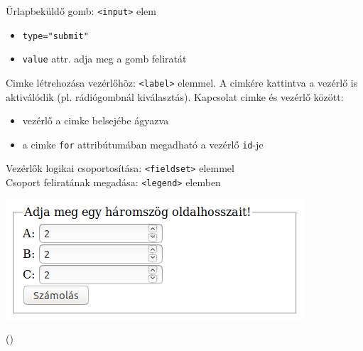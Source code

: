 \begin{frame}
  Űrlapbeküldő gomb: \texttt{<input>} elem
  \begin{itemize}
    \item \texttt{type="submit"}
    \item \texttt{value} attr. adja meg a gomb feliratát
  \end{itemize}
  \vfill
  Cimke létrehozása vezérlőhöz: \texttt{<label>} elemmel. A 
  cimkére kattintva a vezérlő is aktiválódik (pl. rádiógombnál 
  kiválasztás). Kapcsolat cimke és 
  vezérlő között:
  \begin{itemize}
    \item vezérlő a cimke belsejébe ágyazva
    \item a cimke \texttt{for} attribútumában megadható a vezérlő 
    \texttt{id}-je
  \end{itemize}
\end{frame}

\begin{frame}
  Vezérlők logikai csoportosítása: \texttt{<fieldset>} elemmel\\
  Csoport feliratának megadása: \texttt{<legend>} elemben
  \vfill
  \begin{center}
    \includegraphics[width=.5\textwidth]{urlap1.png}
  \end{center}
\end{frame}

\begin{frame}
  \begin{exampleblock}{ 
  ()}
    \footnotesize
    
  \end{exampleblock}
\end{frame}
